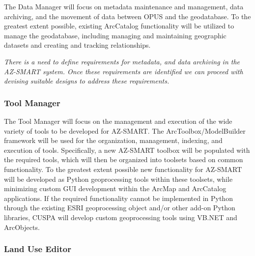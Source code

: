 The Data Manager will focus on metadata maintenance and management,
data archiving, and the movement of data between OPUS and the geodatabase.
To the greatest extent possible, existing ArcCatalog functionality will
be utilized to manage the geodatabase, including managing and maintaining
geographic datasets and creating and tracking relationships.

\emph{There is a need to define requirements for metadata, and data archiving
in the AZ-SMART system.  Once these requirements are identified
we can proceed with devising suitable designs to address these requirements.}

\subsubsection{Tool Manager}

The Tool Manager will focus on the management and execution of the wide
variety of tools to be developed for AZ-SMART.  The ArcToolbox/ModelBuilder
framework will be used for the organization, management, indexing, and
execution of tools.  Specifically, a new AZ-SMART toolbox will be populated
with the required tools, which will then be organized into toolsets based
on common functionality.  To the greatest extent possible new
functionality for AZ-SMART will be developed as Python geoprocessing tools
within these toolsets, while minimizing custom GUI development within
the ArcMap and ArcCatalog applications.  If the required functionality
cannot be implemented in Python through the existing ESRI geoprocessing
object and/or other add-on Python libraries, CUSPA will develop custom
geoprocessing tools using VB.NET and ArcObjects.


\subsubsection{Land Use Editor}

